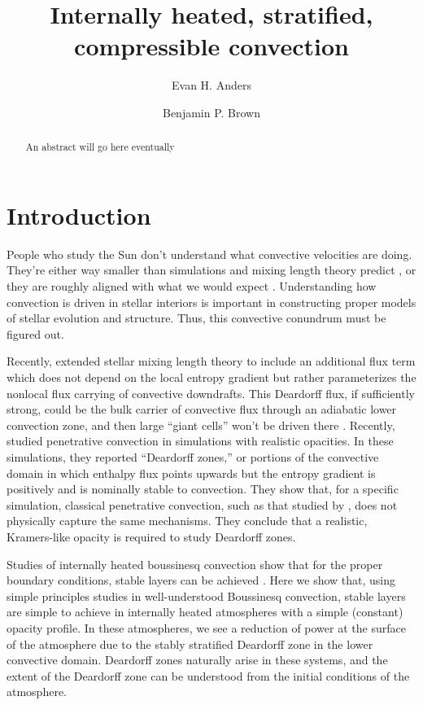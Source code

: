\documentclass[twocolumn]{aastex61}
\begin{document}
\author{Evan H. Anders}
\author{Benjamin P. Brown}
\title{Internally heated, stratified, compressible convection}

\begin{abstract}
An abstract will go here eventually
\end{abstract}


\section{Introduction}
\label{sec:intro}
People who study the Sun don't understand what convective velocities are doing.
They're either way smaller than simulations and mixing length theory predict
\citep{hanasoge&all2012}, or they are roughly aligned with what we would
expect \citep{greer&all2015L}.  Understanding how convection is driven in
stellar interiors is important in constructing proper models of stellar evolution
and structure.  Thus, this convective conundrum must be figured out.

Recently, \cite{brandenburg2016} extended stellar mixing length theory to include
an additional flux term which does not depend on the local entropy gradient but
rather parameterizes the nonlocal flux carrying of convective downdrafts.  This
Deardorff flux, if sufficiently strong, could be the bulk carrier of convective
flux through an adiabatic lower convection zone, and then large ``giant cells'' won't be
driven there \cite{lord&all2014}.  Recently, \cite{kapyla&all2017} studied penetrative
convection in simulations with realistic opacities.  In these simulations, they reported
``Deardorff zones,'' or portions of the convective domain in which enthalpy flux points
upwards but the entropy gradient is positively and is nominally stable to convection.
They show that, for a specific simulation, classical penetrative convection,
such as that studied by \cite{hurlburt&all1986}, does not physically capture the
same mechanisms.  They conclude that a realistic, Kramers-like opacity
is required to study Deardorff zones.

Studies of internally heated boussinesq convection show that for the proper
boundary conditions, stable layers can be achieved \citep{goluskin&vanderpoel2016}.
Here we show that, using simple principles studies in well-understood Boussinesq
convection, stable layers are simple to achieve in internally heated atmospheres
with a simple (constant) opacity profile.  In these atmospheres, we see a reduction
of power at the surface of the atmosphere due to the stably stratified
Deardorff zone in the lower convective domain.  Deardorff zones naturally arise
in these systems, and the extent of the Deardorff zone can be understood from
the initial conditions of the atmosphere.
\end{document}
